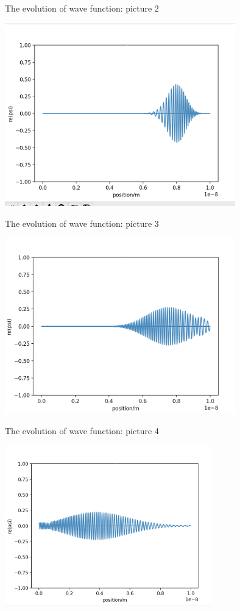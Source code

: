 \documentclass[letterpaper,12pt]{article}
\begin{document}
\begin{table}[!h]
    \centering
    \caption{The evolution of wave function: picture 2}
    \includegraphics[width=10cm]{2}
\end{table}%

\begin{table}[!h]
    \centering
    \caption{The evolution of wave function: picture 3}
    \includegraphics[width=10cm]{3}
\end{table}%
\newpage

\begin{table}[!h]
    \centering
    \caption{The evolution of wave function: picture 4}
    \includegraphics[width=9cm]{4}
\end{table}%
\end{document}
